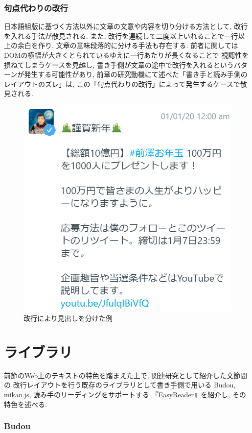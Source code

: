 \subsubsection{句点代わりの改行}
日本語組版に基づく方法以外に文章の文意や内容を切り分ける方法として, 改行を入れる手法が散見される.
また, 改行を連続して二度以上いれることで一行以上の余白を作り, 文章の意味段落的に分ける手法も存在する.
前者に関してはDOMの横幅が大きくとられているゆえに一行あたりが長くなることで
視認性を損ねてしまうケースを見越し, 書き手側が文章の途中で改行を入れるというパターンが発生する可能性があり, 
前章の研究動機にて述べた「書き手と読み手側のレイアウトのズレ」は, この「句点代わりの改行」によって発生するケースで散見される.

\begin{figure}[H]
    \centering
    \label{fig:image8}
    \includegraphics[width=0.6\columnwidth]{image/02/img_4.png}
    \caption[改行により見出しを分けた例] {改行により見出しを分けた例\footnotemark[1]}
\end{figure}

\section{ライブラリ}
前節のWeb上のテキストの特色を踏まえた上で, 関連研究として紹介した文節間の
改行レイアウトを行う既存のライブラリとして書き手側で用いる
Budou\footnotemark[2], mikan.js\footnotemark[3], 読み手のリーディングをサポートする
『EasyReader』を紹介し, その特色を述べる.


\subsubsection{Budou}

